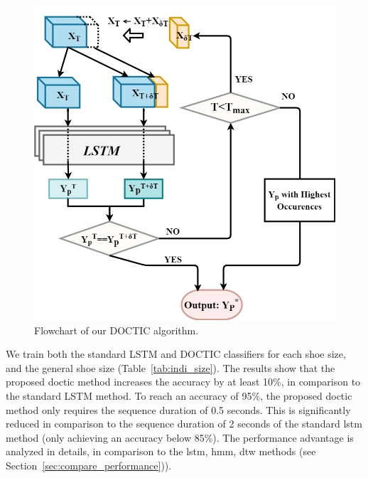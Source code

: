 \documentclass[review]{vgtc}                 %
\begin{document}
\begin{figure}[h]
	\centering
	\includegraphics[width=\linewidth]{figs/flowchart.png}
	\caption{Flowchart of our DOCTIC algorithm.}
	\label{fig:flowchart}
\end{figure}


We train both the standard LSTM and DOCTIC classifiers for each shoe size, and the general shoe size (Table~\ref{tab:indi_size}).
The results show that the proposed \acs{doctic} method increases the accuracy by at least 10\%, in comparison to the standard LSTM method.
To reach an accuracy of 95\%, the proposed \acs{doctic} method only requires the sequence duration of 0.5 seconds.
This is significantly reduced in comparison to the sequence duration of 2 seconds of the standard \acs{lstm} method (only achieving an accuracy below 85\%).
The performance advantage is analyzed in details, in comparison to the \acs{lstm}, \acs{hmm}, \acs{dtw} methods (see Section~\ref{sec:compare_performance})).
\end{document}
